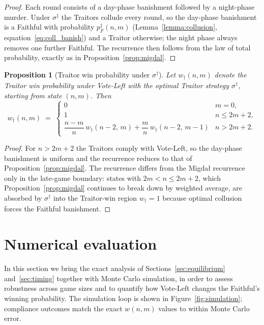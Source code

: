 \documentclass[11pt,a4paper]{article}
\newtheorem{proposition}{Proposition}
\begin{document}
\begin{proof}
Each round consists of a day-phase banishment followed by a night-phase murder.
Under \(\sigma^\ddagger\) the Traitors collude every round, so the day-phase
banishment is a Faithful with probability \(p_F^{\ddagger}(n,m)\)
(Lemma~\ref{lemma:collusion}, equation~\eqref{eq:coll_banish}) and a Traitor
otherwise; the night phase always removes one further Faithful. The recurrence
then follows from the law of total probability, exactly as in
Proposition~\ref{prop:migdal}.
\end{proof}

\begin{proposition}[Traitor win probability under \(\sigma^\dagger\)]
\label{prop:vlopt}
Let \(w_{\dagger}(n, m)\) denote the Traitor win probability under
Vote-Left with the optimal Traitor strategy \(\sigma^\dagger\), starting
from state \((n, m)\). Then
\begin{equation}\label{eq:vlopt}
w_{\dagger}(n, m) \;=\;
\begin{cases}
0 & m = 0, \\[4pt]
1 & n \leq 2m + 2, \\[4pt]
\dfrac{n - m}{n}\, w_{\dagger}(n - 2,\, m)
 + \dfrac{m}{n}\, w_{\dagger}(n - 2,\, m - 1)
& n > 2m + 2.
\end{cases}
\end{equation}
\end{proposition}

\begin{proof}
For \(n > 2m + 2\) the Traitors comply with Vote-Left, so the
day-phase banishment is uniform and the recurrence reduces to that of
Proposition~\ref{prop:migdal}. The recurrence differs from the Migda\l{}
recurrence only in the late-game boundary: states with \(2m < n \leq 2m + 2\),
which Proposition~\ref{prop:migdal} continues to break down by weighted
average, are absorbed by \(\sigma^\dagger\) into the Traitor-win region
\(w_\dagger = 1\) because optimal collusion forces the Faithful banishment.
\end{proof}

\section{Numerical evaluation}\label{sec:sim}

In this section we bring the exact analysis of
Sections~\ref{sec:equilibrium} and~\ref{sec:timing} together with Monte
Carlo simulation, in order to assess robustness across game sizes and to
quantify how Vote-Left changes the Faithful's winning probability. The
simulation loop is shown in Figure~\ref{fig:simulation}; compliance
outcomes match the exact \(w(n, m)\) values to within Monte Carlo error.
\end{document}

